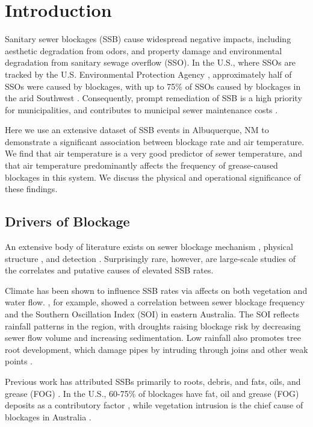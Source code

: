 \documentclass[letterpaper,12pt]{article}
\begin{document}
\section{Introduction}
Sanitary sewer blockages (SSB) cause widespread negative impacts, including
aesthetic degradation from odors, and property damage and environmental
degradation from sanitary sewage overflow (SSO).  In the U.S., where SSOs are
tracked by the U.S. Environmental Protection Agency \cite{epa2004local},
approximately half of SSOs were caused by blockages, with up to 75\% of SSOs
caused by blockages in the arid Southwest \cite{epa2004report}.
Consequently, prompt remediation of SSB is a high priority for municipalities,
and contributes to municipal sewer maintenance costs
\cite{maintenance-cost}.

Here we use an extensive dataset of SSB events in
Albuquerque, NM to demonstrate a significant association
between blockage rate and air temperature.
We find that air temperature is a very good predictor 
of sewer temperature, and that
air temperature predominantly affects the 
frequency of grease-caused blockages in this system.
We discuss the physical and operational significance of 
these findings.

\subsection{Drivers of Blockage}
An extensive body of literature exists on sewer blockage 
mechanism \citep{??}, physical structure \citep{??}, and 
detection \citep{??}.  Surprisingly rare, however, are 
large-scale 
studies of the correlates and putative causes of elevated
SSB rates. 

Climate has been shown to influence SSB rates via affects on both vegetation and water
flow. \cite{Marlow2011}, for example, showed a correlation between sewer
blockage frequency and the Southern Oscillation Index (SOI) in eastern
Australia. The SOI reflects rainfall patterns in the region, with droughts
raising blockage risk by decreasing sewer flow volume and increasing
sedimentation. Low rainfall also promotes tree root development, which damage
pipes by intruding through joins and other weak points \cite{Desilva2011}.

Previous work has attributed SSBs primarily to roots, debris, and fats, oils,
and grease (FOG) \cite{epa2004report}.  In the U.S., 60-75\% of blockages
have fat, oil and grease (FOG) deposits as a contributory factor
\cite{Keener2008}, while vegetation intrusion is the chief cause of
blockages in Australia \cite{Marlow2011}.
\end{document}
